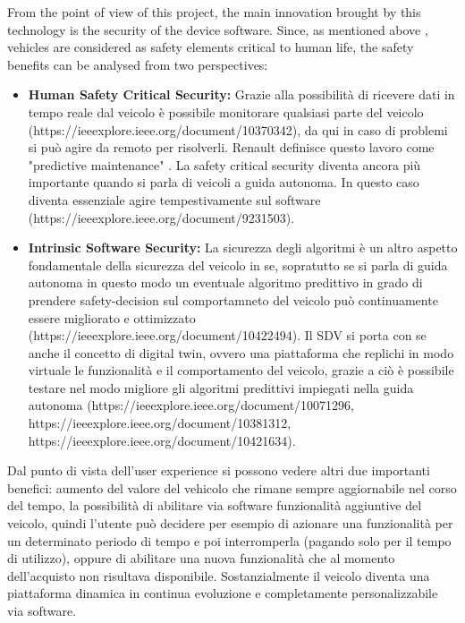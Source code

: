 From the point of view of this project, the main innovation brought by this technology is the security of the device software. Since, as mentioned above \cite{ISO26262}, vehicles are considered as safety elements critical to human life, the safety benefits can be analysed from two perspectives:
\begin{itemize}
    \item \textbf{Human Safety Critical Security:} Grazie alla possibilità di ricevere dati in tempo reale dal veicolo è possibile monitorare qualsiasi parte del veicolo (https://ieeexplore.ieee.org/document/10370342), da qui in caso di problemi si può agire da remoto per risolverli. Renault definisce questo lavoro come "predictive maintenance" \cite{SDVRenault}. La safety critical security diventa ancora più importante quando si parla di veicoli a guida autonoma. In questo caso diventa essenziale agire tempestivamente sul software (https://ieeexplore.ieee.org/document/9231503).
    \item \textbf{Intrinsic Software Security:} La sicurezza degli algoritmi è un altro aspetto fondamentale della sicurezza del veicolo in se, sopratutto se si parla di guida autonoma in questo modo un eventuale algoritmo predittivo in grado di prendere safety-decision sul comportamneto del veicolo può continuamente essere migliorato e ottimizzato (https://ieeexplore.ieee.org/document/10422494). Il SDV si porta con se anche il concetto di digital twin, ovvero una piattaforma che replichi in modo virtuale le funzionalità e il comportamento del veicolo, grazie a ciò è possibile testare nel modo migliore gli algoritmi predittivi impiegati nella guida autonoma (https://ieeexplore.ieee.org/document/10071296, https://ieeexplore.ieee.org/document/10381312, https://ieeexplore.ieee.org/document/10421634). 
\end{itemize}

Dal punto di vista dell'user experience si possono vedere altri due importanti benefici: aumento del valore del vehicolo che rimane sempre aggiornabile nel corso del tempo, la possibilità di abilitare via software funzionalità aggiuntive del veicolo, quindi l'utente può decidere per esempio di azionare una funzionalità per un determinato periodo di tempo e poi interromperla (pagando solo per il tempo di utilizzo), oppure di abilitare una nuova funzionalità che al momento dell'acquisto non risultava disponibile. Sostanzialmente il veicolo diventa una piattaforma dinamica in continua evoluzione e completamente personalizzabile via software.

